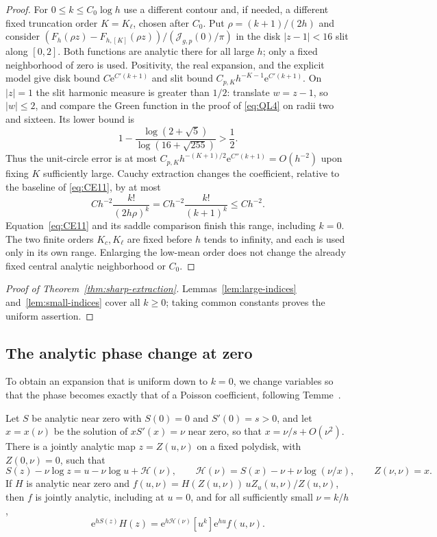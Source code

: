 \begin{proof}
For $0\le k\le C_0\log h$ use a different contour and, if needed,
a different fixed truncation order $K=K_\ell$, chosen after $C_0$. Put
$\rho=(k+1)/(2h)$ and consider
$(F_h(\rho z)-F_{h,[K]}(\rho z))/(\mathcal J_{g,p}(0)/\pi)$
in the disk $|z-1|<16$ slit along $[0,2]$.
Both functions are analytic there for all large $h$; only a fixed
neighborhood of zero is used. Positivity, the real expansion, and
the explicit model give disk bound $C\mathrm{e}^{C'(k+1)}$ and slit bound
$C_{p,K}h^{-K-1}\mathrm{e}^{C'(k+1)}$.
On $|z|=1$ the slit harmonic measure is greater than $1/2$:
translate $w=z-1$, so $|w|\le2$, and compare the Green function
in the proof of \eqref{eq:QL4} on radii two and sixteen.
Its lower bound is
\[
 1-\frac{\log(2+\sqrt5)}{\log(16+\sqrt{255})}>\frac12.
\]
Thus the unit-circle error is at most
$C_{p,K}h^{-(K+1)/2}\mathrm{e}^{C''(k+1)}=O(h^{-2})$ upon fixing $K$
sufficiently large. Cauchy extraction changes the coefficient,
relative to the baseline of \eqref{eq:CE11}, by at most
\[
 Ch^{-2}\frac{k!}{(2h\rho)^k}
       =Ch^{-2}\frac{k!}{(k+1)^k}\le Ch^{-2}.
\]
Equation~\eqref{eq:CE11} and its saddle comparison finish this
range, including $k=0$. The two finite orders $K_c,K_\ell$ are fixed before $h$ tends to
infinity, and each is used only in its own range. Enlarging the
low-mean order does not change the already fixed central analytic
neighborhood or $C_0$.
\end{proof}

\begin{proof}[Proof of Theorem~\ref{thm:sharp-extraction}]
Lemmas~\ref{lem:large-indices} and~\ref{lem:small-indices} cover all
$k\ge0$; taking common constants proves the uniform assertion.
\end{proof}

\subsection{The analytic phase change at zero}\label{app:phase-change}

To obtain an expansion that is uniform down to $k=0$, we change variables
so that the phase becomes exactly that of a Poisson coefficient, following
Temme~\cite{Temme}.

\begin{lemma}\label{lem:phase-change}
Let $S$ be analytic near zero with $S(0)=0$ and $S'(0)=s>0$, and let
$x=x(\nu)$ be the solution of $xS'(x)=\nu$ near zero, so that
$x=\nu/s+O(\nu^2)$. There is a jointly analytic map $z=Z(u,\nu)$ on a fixed
polydisk, with $Z(0,\nu)=0$, such that
\begin{equation}
 S(z)-\nu\log z=u-\nu\log u+\mathcal H(\nu),\qquad
 \mathcal H(\nu)=S(x)-\nu+\nu\log(\nu/x),\qquad Z(\nu,\nu)=x.
 \label{eq:CG5}
\end{equation}
If $H$ is analytic near zero and
$f(u,\nu)=H(Z(u,\nu))\,uZ_u(u,\nu)/Z(u,\nu)$, then $f$ is jointly analytic,
including at $u=0$, and for all sufficiently small $\nu=k/h$,
\begin{equation}
 [z^k]\mathrm{e}^{hS(z)}H(z)
       =\mathrm{e}^{h\mathcal H(\nu)}[u^k]\mathrm{e}^{hu}f(u,\nu).
 \label{eq:CG7}
\end{equation}
\end{lemma}

